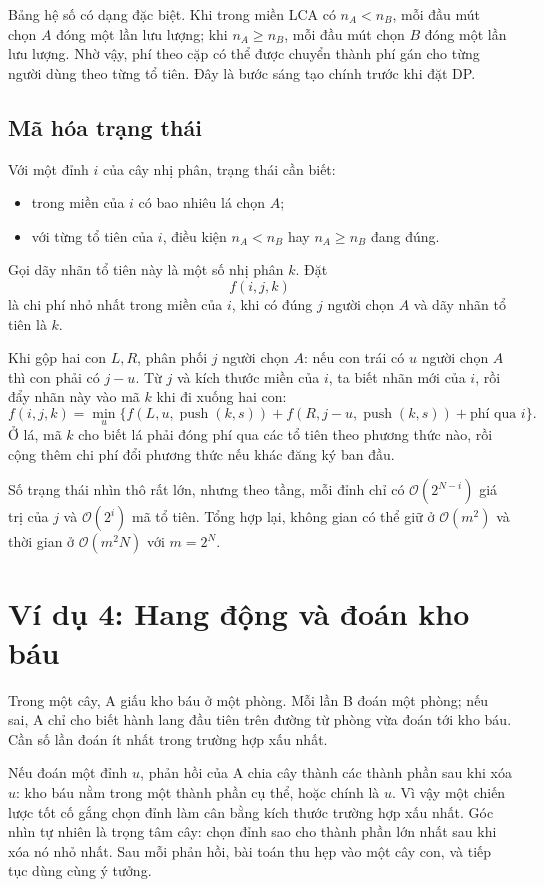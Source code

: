 \documentclass[11pt]{article}
\newcommand{\Oh}{\mathcal{O}}
\begin{document}
Bảng hệ số có dạng đặc biệt. Khi trong miền LCA có \(n_A<n_B\), mỗi đầu mút
chọn \(A\) đóng một lần lưu lượng; khi \(n_A\ge n_B\), mỗi đầu mút chọn \(B\)
đóng một lần lưu lượng. Nhờ vậy, phí theo cặp có thể được chuyển thành phí
gán cho từng người dùng theo từng tổ tiên. Đây là bước sáng tạo chính trước
khi đặt DP.

\subsection{Mã hóa trạng thái}

Với một đỉnh \(i\) của cây nhị phân, trạng thái cần biết:
\begin{itemize}
  \item trong miền của \(i\) có bao nhiêu lá chọn \(A\);
  \item với từng tổ tiên của \(i\), điều kiện \(n_A<n_B\) hay \(n_A\ge n_B\)
  đang đúng.
\end{itemize}
Gọi dãy nhãn tổ tiên này là một số nhị phân \(k\). Đặt
\[
  f(i,j,k)
\]
là chi phí nhỏ nhất trong miền của \(i\), khi có đúng \(j\) người chọn \(A\)
và dãy nhãn tổ tiên là \(k\).

Khi gộp hai con \(L,R\), phân phối \(j\) người chọn \(A\): nếu con trái có
\(u\) người chọn \(A\) thì con phải có \(j-u\). Từ \(j\) và kích thước miền
của \(i\), ta biết nhãn mới của \(i\), rồi đẩy nhãn này vào mã \(k\) khi đi
xuống hai con:
\[
  f(i,j,k)=
  \min_u\{f(L,u,\operatorname{push}(k,s))
        +f(R,j-u,\operatorname{push}(k,s))+\text{phí qua }i\}.
\]
Ở lá, mã \(k\) cho biết lá phải đóng phí qua các tổ tiên theo phương thức
nào, rồi cộng thêm chi phí đổi phương thức nếu khác đăng ký ban đầu.

Số trạng thái nhìn thô rất lớn, nhưng theo tầng, mỗi đỉnh chỉ có
\(\Oh(2^{N-i})\) giá trị của \(j\) và \(\Oh(2^i)\) mã tổ tiên. Tổng hợp lại,
không gian có thể giữ ở \(\Oh(m^2)\) và thời gian ở \(\Oh(m^2N)\) với
\(m=2^N\).

\section{Ví dụ 4: Hang động và đoán kho báu}

Trong một cây, A giấu kho báu ở một phòng. Mỗi lần B đoán một phòng; nếu sai,
A chỉ cho biết hành lang đầu tiên trên đường từ phòng vừa đoán tới kho báu.
Cần số lần đoán ít nhất trong trường hợp xấu nhất.

Nếu đoán một đỉnh \(u\), phản hồi của A chia cây thành các thành phần sau khi
xóa \(u\): kho báu nằm trong một thành phần cụ thể, hoặc chính là \(u\). Vì
vậy một chiến lược tốt cố gắng chọn đỉnh làm cân bằng kích thước trường hợp
xấu nhất. Góc nhìn tự nhiên là trọng tâm cây: chọn đỉnh sao cho thành phần
lớn nhất sau khi xóa nó nhỏ nhất. Sau mỗi phản hồi, bài toán thu hẹp vào một
cây con, và tiếp tục dùng cùng ý tưởng.
\end{document}
